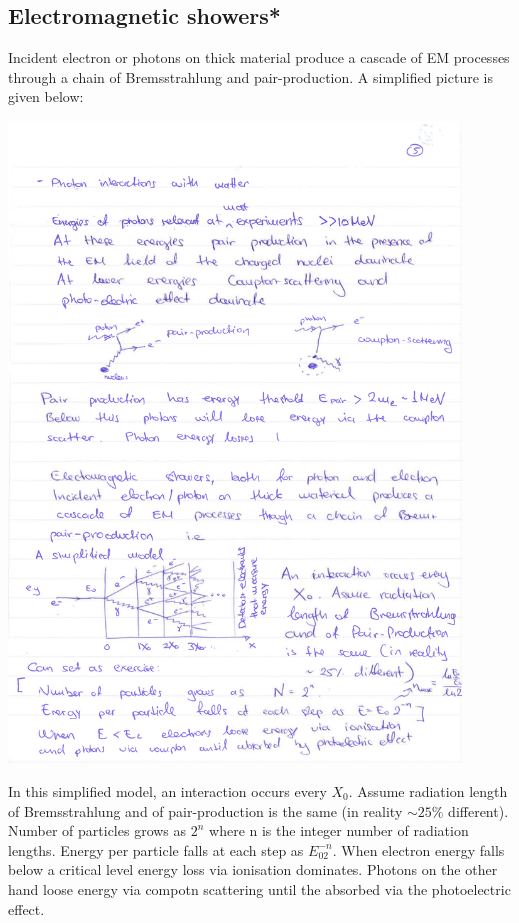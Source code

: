 \subsection{Electromagnetic showers*}
Incident electron or photons on thick material produce a cascade of EM processes through a chain of Bremsstrahlung and pair-production. A simplified picture is given below:
\begin{center}
\includegraphics[width=0.90\textwidth]{fig/detector/em_shower.pdf}
\end{center}
In this simplified model, an interaction occurs every $X_0$. Assume radiation length of Bremsstrahlung and of pair-production is the same (in reality $\sim25\%$ different). 
Number of particles grows as $2^n$ where n is the integer number of radiation lengths. Energy per particle falls at each step as $E_02^{-n}$.
When electron energy falls below a critical level energy loss via ionisation dominates. Photons on the other hand loose energy via compotn scattering until the absorbed via the photoelectric effect.

